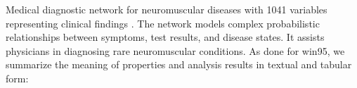 Medical diagnostic network for neuromuscular diseases with 1041 variables representing clinical findings \cite{andreassen1989}. The network models complex probabilistic relationships between symptoms, test results, and disease states. It assists physicians in diagnosing rare neuromuscular conditions. As done for win95, we summarize the meaning of properties and analysis results in textual and tabular form:
